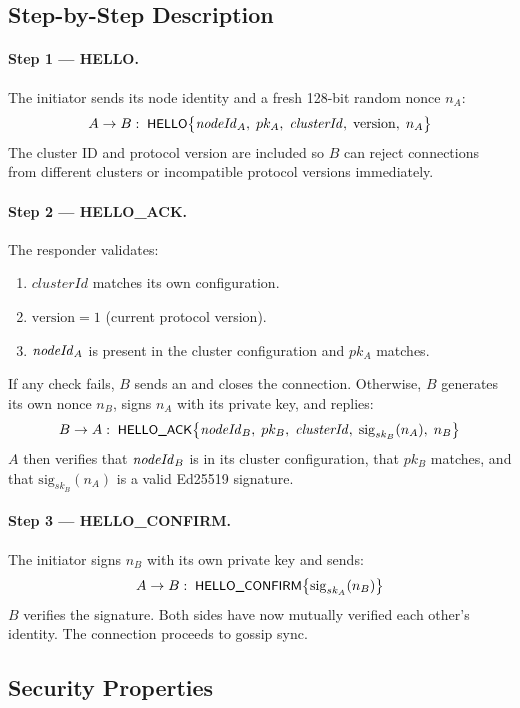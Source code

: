 \subsection{Step-by-Step Description}

\paragraph{Step 1 — HELLO.}
The initiator sends its node identity and a fresh 128-bit random nonce $n_A$:
\[
  A \to B:\; \textsf{\small HELLO}\bigl\{\mathit{nodeId}_A,\; pk_A,\; \mathit{clusterId},\;
             \mathrm{version},\; n_A\bigr\}
\]
The cluster ID and protocol version are included so $B$ can reject connections
from different clusters or incompatible protocol versions immediately.

\paragraph{Step 2 — HELLO\_ACK.}
The responder validates:
\begin{enumerate}[leftmargin=1.5em]
  \item $\mathit{clusterId}$ matches its own configuration.
  \item $\mathrm{version} = 1$ (current protocol version).
  \item $\mathit{nodeId}_A$ is present in the cluster configuration and $pk_A$ matches.
\end{enumerate}
If any check fails, $B$ sends an  and closes the connection.
Otherwise, $B$ generates its own nonce $n_B$, signs $n_A$ with its private key,
and replies:
\[
  B \to A:\; \textsf{\small HELLO\_ACK}\bigl\{\mathit{nodeId}_B,\; pk_B,\; \mathit{clusterId},\;
             \mathrm{sig}_{sk_B}(n_A),\; n_B\bigr\}
\]
$A$ then verifies that $\mathit{nodeId}_B$ is in its cluster configuration, that $pk_B$
matches, and that $\mathrm{sig}_{sk_B}(n_A)$ is a valid Ed25519 signature.

\paragraph{Step 3 — HELLO\_CONFIRM.}
The initiator signs $n_B$ with its own private key and sends:
\[
  A \to B:\; \textsf{\small HELLO\_CONFIRM}\bigl\{\mathrm{sig}_{sk_A}(n_B)\bigr\}
\]
$B$ verifies the signature. Both sides have now mutually verified each other's
identity. The connection proceeds to gossip sync.

\subsection{Security Properties}


